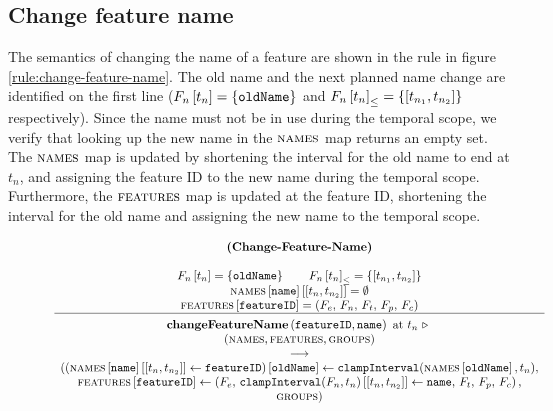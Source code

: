 \subsection{Change feature name}
\label{sub:change-feature-name}

The semantics of changing the name of a feature are shown in the  rule in figure \vref{rule:change-feature-name}. The old name and the next planned name change are identified on the first line ($F_n \left[ t_n \right] = \left\{\texttt{oldName}\right\}$ and $\containing{F_n}{t_n} = \set{\interval{t_{n_1}}{t_{n_2}}}$ respectively). Since the name must not be in use during the temporal scope, we verify that looking up the new name in the $\textsc{names}{}$ map returns an empty set. The $\textsc{names}{}$ map is updated by shortening the interval for the old name to end at $t_n$, and assigning the feature ID to the new name during the temporal scope. Furthermore, the $\textsc{features}{}$ map is updated at the feature ID, shortening the interval for the old name and assigning the new name to the temporal scope. 

\begin{figure}
    \renewcommand{\arraystretch}{1.1}
    \sossize$$\begin{array}{c}
      \ntyperule{Change-Feature-Name}
      {\\
        \lookup{F_n}{t_n} = \set{\var{oldName}} \qquad
        \containing{F_n}{t_n} = \set{\interval{t_{n_1}}{t_{n_2}}} \\
        \lookup{\lookup{\names{}}{\var{name}}}{\interval{t_n}{t_{n_2}}} = \emptyset \\
        \lookup{\features{}}{\var{featureID}} = \feature
      }
      {
        \textbf{changeFeatureName}\left( \var{featureID}, \var{name}\right) \text{ at } t_n \shove \\
        (\names{}, \features{}, \groups{}) \\
        \transition \\
        (\lookup{\left(\lookup{\lookup{\names{}}{\var{name}}}{\interval{t_n}{t_{n_2}}} \assign \var{featureID}\right)}{\var{oldName}} \assign \var{clampInterval}(\lookup{\names}{\var{oldName}}, t_n), \\
        \lookup{\features{}}{\var{featureID}} \assign \left( F_e,\, \lookup{\var{clampInterval}(F_n, t_n)}{\interval{t_n}{t_{n_2}}} \assign \var{name},\, F_t,\, F_p,\, F_c \right), \\
        \groups{})
      }
    \end{array}$$
  \caption{\label{rule:change-feature-name}}
\end{figure}
